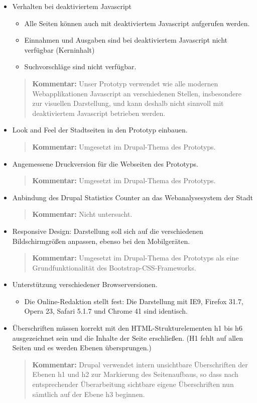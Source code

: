 \documentclass[11pt,a4paper,twoside]{article}
\newcommand{\kommentar}[1]{\begin{quote}\textbf{Kommentar:} #1 \end{quote}}
\begin{document}
\begin{itemize}
\item Verhalten bei deaktiviertem Javascript
  \begin{itemize}
  \item Alle Seiten können auch mit deaktiviertem Javascript aufgerufen
    werden. 
  \item Einnahmen und Ausgaben sind bei deaktiviertem Javascript nicht
    verfügbar (Kerninhalt)
  \item Suchvorschläge sind nicht verfügbar.
  \end{itemize}

\kommentar{Unser Prototyp verwendet wie alle modernen Webapplikationen
  Javascript an verschiedenen Stellen, insbesondere zur visuellen Darstellung,
  und kann deshalb nicht sinnvoll mit deaktiviertem Javascript betrieben
  werden. }

\item Look and Feel der Stadtseiten in den Prototyp einbauen.
\kommentar{Umgesetzt im Drupal-Thema des Prototyps.}
\item Angemessene Druckversion für die Webseiten des Prototyps.
\kommentar{Umgesetzt im Drupal-Thema des Prototyps.}
\item Anbindung des Drupal Statistics Counter an das Webanalysesystem der
  Stadt
\kommentar{Nicht untersucht.}
\item Responsive Design: Darstellung soll sich auf die verschiedenen
  Bildschirmgrößen anpassen, ebenso bei den Mobilgeräten. 
\kommentar{Umgesetzt im Drupal-Thema des Prototyps als eine Grundfunktionalität
  des Bootstrap-CSS-Frameworks.}

\item Unterstützung verschiedener Browserversionen.
  \begin{itemize}
  \item Die Online-Redaktion stellt fest: Die Darstellung mit IE9, Firefox
    31.7, Opera 23, Safari 5.1.7 und Chrome 41 sind identisch.
  \end{itemize}
\item Überschriften müssen korrekt mit den HTML-Strukturelementen h1 bis h6
  ausgezeichnet sein und die Inhalte der Seite erschließen. (H1 fehlt auf
  allen Seiten und es werden Ebenen übersprungen.)

\kommentar{Drupal verwendet intern unsichtbare Überschriften der Ebenen h1 und
  h2 zur Markierung des Seitenaufbaus, so dass nach entsprechender
  Überarbeitung sichtbare eigene Überschriften nun sämtlich auf der Ebene h3
  beginnen. }
\end{itemize}
\end{document}
